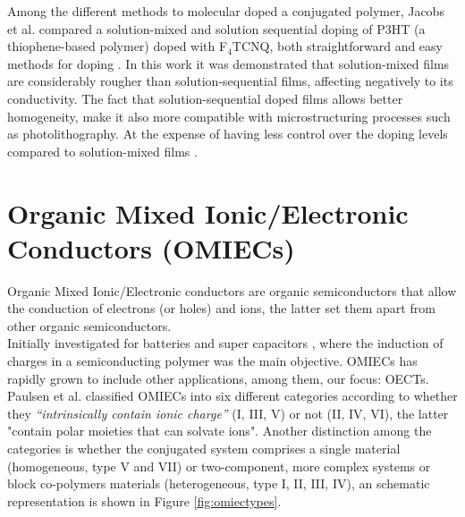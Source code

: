 Among the different methods to molecular doped a conjugated polymer, Jacobs et al. compared a solution-mixed and solution sequential doping of P3HT (a thiophene-based polymer) doped with F$_{4}$TCNQ, both straightforward and easy methods for doping \cite{jacobsComparisonSolutionmixedSequentially2016}. In this work it was demonstrated that solution-mixed films are considerably rougher than solution-sequential films, affecting negatively to its conductivity. The fact that solution-sequential doped films allows better homogeneity, make it also more compatible with microstructuring processes such as photolithography. At the expense of having less control over the doping levels compared to solution-mixed films \cite{tanOrganicMixedIonic2022}.




\section{Organic Mixed Ionic/Electronic Conductors (OMIECs)}

Organic Mixed Ionic/Electronic conductors are organic semiconductors that allow the conduction of electrons (or holes) and ions, the latter set them apart from other organic semiconductors.\\
Initially investigated for batteries and super capacitors \cite{snookConductingpolymerbasedSupercapacitorDevices2011}
\cite{liangOrganicElectrodeMaterials2012}, where the induction of charges in a semiconducting polymer was the main objective. OMIECs has rapidly grown to include other applications, among them, our focus: OECTs.\\
Paulsen et al. classified OMIECs into six different categories according to whether they \textit{``intrinsically contain ionic charge''} (I, III, V) or not (II, IV, VI), the latter "contain polar moieties that can solvate ions". Another distinction among the categories is whether the conjugated system comprises a single material (homogeneous, type V and VII) or two-component, more complex systems or block co-polymers materials (heterogeneous, type I, II, III, IV)\cite{paulsenOrganicMixedIonic2020}, an schematic representation is shown in Figure \ref{fig:omiectypes}. 

